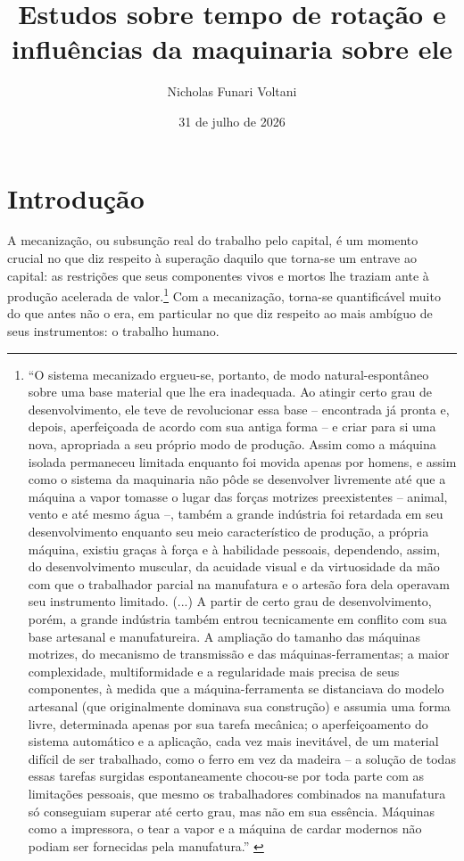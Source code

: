 \documentclass[12pt]{article}
\title{Estudos sobre tempo de rotação e influências da maquinaria sobre ele}
\author{Nicholas Funari Voltani}
\date{31 de julho de 2026}
\numberwithin{equation}{section}
\theoremstyle{plain}
\theoremstyle{definition}
\theoremstyle{remark}
\begin{document}
\maketitle

\section{Introdução}
A mecanização, ou subsunção real do trabalho pelo capital, é um momento crucial no que diz respeito à superação daquilo que torna-se um entrave ao capital: as restrições que seus componentes vivos e mortos lhe traziam ante à produção acelerada de valor.\footnote{``O sistema mecanizado ergueu-se, portanto, de modo natural-espontâneo sobre uma base material que lhe era inadequada. Ao atingir certo grau de desenvolvimento, ele teve de revolucionar essa base – encontrada já pronta e, depois, aperfeiçoada de acordo com sua antiga forma – e criar para si uma nova, apropriada a seu próprio modo de produção. Assim como a máquina isolada permaneceu limitada enquanto foi movida apenas por homens, e assim como o sistema da maquinaria não pôde se desenvolver livremente até que a máquina a vapor tomasse o lugar das forças motrizes preexistentes – animal, vento e até mesmo água –, também a grande indústria foi retardada em seu desenvolvimento enquanto seu meio característico de produção, a própria máquina, existiu graças à força e à habilidade pessoais, dependendo, assim, do desenvolvimento muscular, da acuidade visual e da virtuosidade da mão com que o trabalhador parcial na manufatura e o artesão fora dela operavam seu instrumento limitado. (...) A partir de certo grau de desenvolvimento, porém, a grande indústria também entrou tecnicamente em conflito com sua base artesanal e manufatureira. A ampliação do tamanho das máquinas motrizes, do mecanismo de transmissão e das máquinas-ferramentas; a maior complexidade, multiformidade e a regularidade mais precisa de seus componentes, à medida que a máquina-ferramenta se distanciava do modelo artesanal (que originalmente dominava sua construção) e assumia uma forma livre, determinada apenas por sua tarefa mecânica; o aperfeiçoamento do sistema automático e a aplicação, cada vez mais inevitável, de um material difícil de ser trabalhado, como o ferro em vez da madeira – a solução de todas essas tarefas surgidas espontaneamente chocou-se por toda parte com as limitações pessoais, que mesmo os trabalhadores combinados na manufatura só conseguiam superar até certo grau, mas não em sua essência. Máquinas como a impressora, o tear a vapor e a máquina de cardar modernos não podiam ser fornecidas pela manufatura.'' \parencite[p. 456-7]{Marx2017}} Com a mecanização, torna-se quantificável muito do que antes não o era, em particular no que diz respeito ao mais ambíguo de seus instrumentos: o trabalho humano. 
\end{document}
